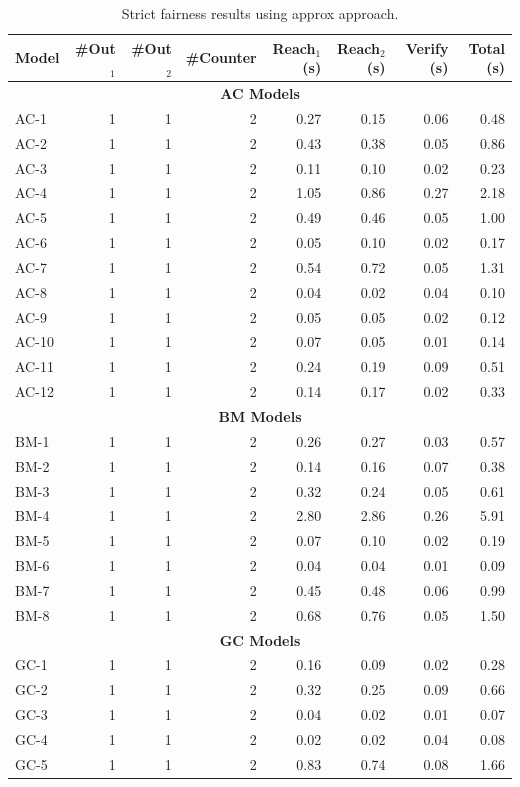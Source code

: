 \begin{table}[htbp]
\centering
\begin{tabular}{|l|r|r|r|r|r|r|r|}
\hline
Model & \#Out$_1$ & \#Out$_2$ & \#Counter & Reach$_1$ (s) & Reach$_2$ (s) & Verify (s) & Total (s) \\
\hline
\multicolumn{8}{|c|}{\textbf{AC Models}} \\
\hline
AC-1 & 1 & 1 & 2 & 0.27 & 0.15 & 0.06 & 0.48 \\
AC-2 & 1 & 1 & 2 & 0.43 & 0.38 & 0.05 & 0.86 \\
AC-3 & 1 & 1 & 2 & 0.11 & 0.10 & 0.02 & 0.23 \\
AC-4 & 1 & 1 & 2 & 1.05 & 0.86 & 0.27 & 2.18 \\
AC-5 & 1 & 1 & 2 & 0.49 & 0.46 & 0.05 & 1.00 \\
AC-6 & 1 & 1 & 2 & 0.05 & 0.10 & 0.02 & 0.17 \\
AC-7 & 1 & 1 & 2 & 0.54 & 0.72 & 0.05 & 1.31 \\
AC-8 & 1 & 1 & 2 & 0.04 & 0.02 & 0.04 & 0.10 \\
AC-9 & 1 & 1 & 2 & 0.05 & 0.05 & 0.02 & 0.12 \\
AC-10 & 1 & 1 & 2 & 0.07 & 0.05 & 0.01 & 0.14 \\
AC-11 & 1 & 1 & 2 & 0.24 & 0.19 & 0.09 & 0.51 \\
AC-12 & 1 & 1 & 2 & 0.14 & 0.17 & 0.02 & 0.33 \\
\hline
\multicolumn{8}{|c|}{\textbf{BM Models}} \\
\hline
BM-1 & 1 & 1 & 2 & 0.26 & 0.27 & 0.03 & 0.57 \\
BM-2 & 1 & 1 & 2 & 0.14 & 0.16 & 0.07 & 0.38 \\
BM-3 & 1 & 1 & 2 & 0.32 & 0.24 & 0.05 & 0.61 \\
BM-4 & 1 & 1 & 2 & 2.80 & 2.86 & 0.26 & 5.91 \\
BM-5 & 1 & 1 & 2 & 0.07 & 0.10 & 0.02 & 0.19 \\
BM-6 & 1 & 1 & 2 & 0.04 & 0.04 & 0.01 & 0.09 \\
BM-7 & 1 & 1 & 2 & 0.45 & 0.48 & 0.06 & 0.99 \\
BM-8 & 1 & 1 & 2 & 0.68 & 0.76 & 0.05 & 1.50 \\
\hline
\multicolumn{8}{|c|}{\textbf{GC Models}} \\
\hline
GC-1 & 1 & 1 & 2 & 0.16 & 0.09 & 0.02 & 0.28 \\
GC-2 & 1 & 1 & 2 & 0.32 & 0.25 & 0.09 & 0.66 \\
GC-3 & 1 & 1 & 2 & 0.04 & 0.02 & 0.01 & 0.07 \\
GC-4 & 1 & 1 & 2 & 0.02 & 0.02 & 0.04 & 0.08 \\
GC-5 & 1 & 1 & 2 & 0.83 & 0.74 & 0.08 & 1.66 \\
\hline
\end{tabular}
\caption{Strict fairness results using approx approach.}
\label{tab:strict_fair_approx}
\end{table}